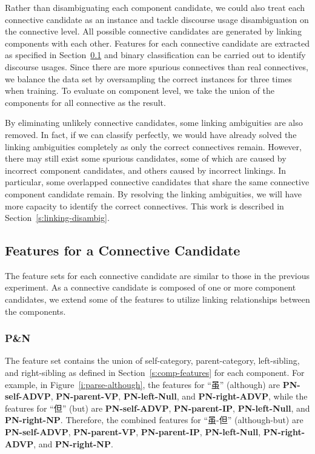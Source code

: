 Rather than disambiguating each component candidate, we could also treat each connective
candidate as an instance and tackle discourse usage disambiguation on the connective
level. All possible connective candidates are  generated by linking components with
each other. Features for each connective candidate are extracted as specified in
Section~\ref{s:connective-features} and binary
classification can be carried out to identify discourse usages.
Since there are more spurious connectives than real connectives, we balance the
data set by oversampling the correct instances for three times when training. To evaluate on
component level, we take the union of the components for all connective as the result.

By eliminating unlikely connective candidates, some linking ambiguities 
are also removed. In fact, if we can classify perfectly, we would have already
solved the linking ambiguities completely as only the correct connectives remain.
However, there may still exist some spurious candidates, some of which are
caused by incorrect component candidates, and others caused by
incorrect linkings.
In particular, some overlapped connective candidates that share the same
connective component candidate remain. By resolving the linking
ambiguities, we will have more capacity to identify the correct connectives. This
work is described in Section~\ref{s:linking-disambig}.

\subsection{Features for a Connective Candidate}
\label{s:connective-features}

The feature sets for each connective candidate are similar to those in the previous
experiment. As a connective candidate is composed of one or more component candidates,
we extend some of the features to utilize linking relationships between the
components.

\subsubsection{P\&N}

The feature set contains the union of self-category, parent-category, left-sibling,
and right-sibling as defined in Section~\ref{s:comp-features} for each component.
For example, in Figure~\ref{i:parse-although}, the features for ``虽'' (although) are
\textbf{PN-self-ADVP}, \textbf{PN-parent-VP}, \textbf{PN-left-Null}, and \textbf{PN-right-ADVP}, while
the features for ``但'' (but) are \textbf{PN-self-ADVP}, \textbf{PN-parent-IP}, \textbf{PN-left-Null},
and \textbf{PN-right-NP}. Therefore, the combined features for ``虽-但'' (although-but) are
\textbf{PN-self-ADVP}, \textbf{PN-parent-VP}, \textbf{PN-parent-IP}, \textbf{PN-left-Null},
\textbf{PN-right-ADVP}, and \textbf{PN-right-NP}.


